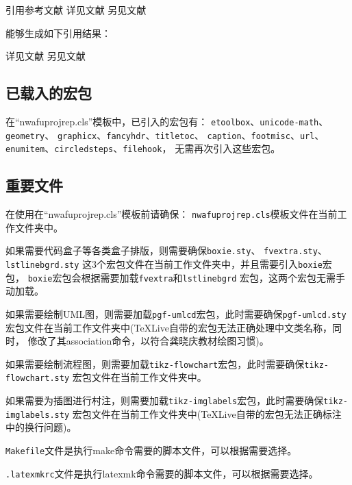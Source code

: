 \documentclass[
  ]{nwafuprojrep}
\begin{document}
\begin{center}
  \begin{langCVOne}[tex][texcode06][\LaTeX{}]{引用参考文献}
    详见文献\cite{Peebles2001-100-100}\parencite{Babu2014--}
    另见文献\cite[49]{于潇2012-1518-1523}\parencite[106]{Babu2014--}
  \end{langCVOne}
\end{center}

能够生成如下引用结果：

详见文献\cite{Peebles2001-100-100}\parencite{Babu2014--}
另见文献\cite[49]{于潇2012-1518-1523}\parencite[106]{Babu2014--}

\subsection{已载入的宏包}
在\enquote{nwafuprojrep.cls}模板中，已引入的宏包有：
\verb|etoolbox|、\verb|unicode-math|、\verb|geometry|、
\verb|graphicx|、\verb|fancyhdr|、\verb|titletoc|、
\verb|caption|、\verb|footmisc|、\verb|url|、
\verb|enumitem|、\verb|circledsteps|、\verb|filehook|，
无需再次引入这些宏包。

\subsection{重要文件}
\begin{importantBox}
  在使用在\enquote{nwafuprojrep.cls}模板前请确保：
  \verb|nwafuprojrep.cls|模板文件在当前工作文件夹中。
  
  如果需要代码盒子等各类盒子排版，则需要确保\verb|boxie.sty|、
  \verb|fvextra.sty|、\verb|lstlinebgrd.sty|
  这3个宏包文件在当前工作文件夹中，并且需要引入\verb|boxie|宏包，
  \verb|boxie|宏包会根据需要加载\verb|fvextra|和\verb|lstlinebgrd|
  宏包，这两个宏包无需手动加载。
  
  如果需要绘制UML图，则需要加载\verb|pgf-umlcd|宏包，此时需要确保\verb|pgf-umlcd.sty|
  宏包文件在当前工作文件夹中(TeXLive自带的宏包无法正确处理中文类名称，同时，
  修改了其association命令，以符合龚晓庆教材绘图习惯)。
  
  如果需要绘制流程图，则需要加载\verb|tikz-flowchart|宏包，此时需要确保\verb|tikz-flowchart.sty|
  宏包文件在当前工作文件夹中。
  
  如果需要为插图进行村注，则需要加载\verb|tikz-imglabels|宏包，此时需要确保\verb|tikz-imglabels.sty|
  宏包文件在当前工作文件夹中(TeXLive自带的宏包无法正确标注中的换行问题)。

  \verb|Makefile|文件是执行make命令需要的脚本文件，可以根据需要选择。

  \verb|.latexmkrc|文件是执行latexmk命令需要的脚本文件，可以根据需要选择。
\end{importantBox}
\end{document}
